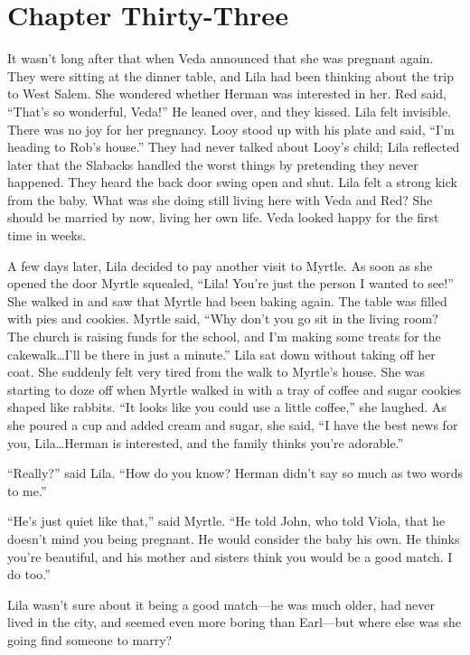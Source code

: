 \documentclass[
  letterpaper,
]{book}
\begin{document}

\chapter{Chapter Thirty-Three}\label{chapter-thirty-three}

It wasn't long after that when Veda announced that she was pregnant
again. They were sitting at the dinner table, and Lila had been thinking
about the trip to West Salem. She wondered whether Herman was interested
in her. Red said, ``That's so wonderful, Veda!'' He leaned over, and
they kissed. Lila felt invisible. There was no joy for her pregnancy.
Looy stood up with his plate and said, ``I'm heading to Rob's house.''
They had never talked about Looy's child; Lila reflected later that the
Slabacks handled the worst things by pretending they never happened.
They heard the back door swing open and shut. Lila felt a strong kick
from the baby. What was she doing still living here with Veda and Red?
She should be married by now, living her own life. Veda looked happy for
the first time in weeks.

A few days later, Lila decided to pay another visit to Myrtle. As soon
as she opened the door Myrtle squealed, ``Lila! You're just the person I
wanted to see!'' She walked in and saw that Myrtle had been baking
again. The table was filled with pies and cookies. Myrtle said, ``Why
don't you go sit in the living room? The church is raising funds for the
school, and I'm making some treats for the cakewalk\ldots I'll be there
in just a minute.'' Lila sat down without taking off her coat. She
suddenly felt very tired from the walk to Myrtle's house. She was
starting to doze off when Myrtle walked in with a tray of coffee and
sugar cookies shaped like rabbits. ``It looks like you could use a
little coffee,'' she laughed. As she poured a cup and added cream and
sugar, she said, ``I have the best news for you, Lila\ldots Herman is
interested, and the family thinks you're adorable.''

``Really?'' said Lila. ``How do you know? Herman didn't say so much as
two words to me.''

``He's just quiet like that,'' said Myrtle. ``He told John, who told
Viola, that he doesn't mind you being pregnant. He would consider the
baby his own. He thinks you're beautiful, and his mother and sisters
think you would be a good match. I do too.''

Lila wasn't sure about it being a good match---he was much older, had
never lived in the city, and seemed even more boring than Earl---but
where else was she going find someone to marry?
\end{document}
